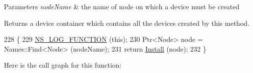 \begin{DoxyParams}{Parameters}
{\em node\+Name} & the name of node on which a device must be created \\
\hline
\end{DoxyParams}
\begin{DoxyReturn}{Returns}
a device container which contains all the devices created by this method. 
\end{DoxyReturn}

\begin{DoxyCode}
228 \{
229   \hyperlink{log-macros-disabled_8h_a90b90d5bad1f39cb1b64923ea94c0761}{NS\_LOG\_FUNCTION} (\textcolor{keyword}{this});
230   Ptr<Node> node = Names::Find<Node> (nodeName);
231   \textcolor{keywordflow}{return} \hyperlink{classns3_1_1SpectrumAnalyzerHelper_a64479eb63eb6b5ad5536ee8ecf2c717a}{Install} (node);
232 \}
\end{DoxyCode}


Here is the call graph for this function\+:


